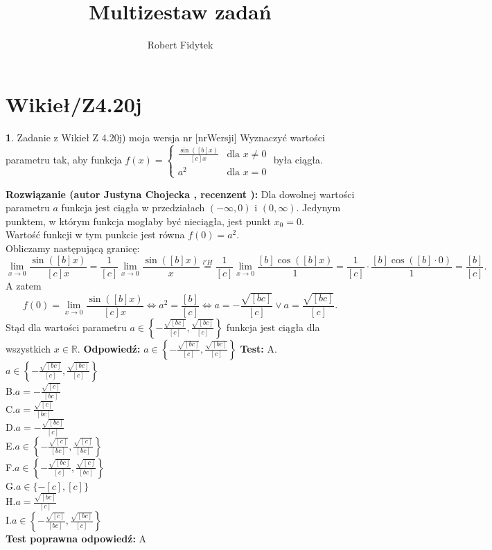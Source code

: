 \documentclass[12pt, a4paper]{article}
\title{Multizestaw zadań}
\author{Robert Fidytek}
\date{}
\theoremstyle{definition} %
\newtheorem{zad}{}
\newcommand{\kategoria}[1]{\section{#1}} %
\newcommand{\zadStart}[1]{\begin{zad}#1\newline} %
\newcommand{\zadStop}{\end{zad}}   %
\newcommand{\rozwStart}[2]{\noindent \textbf{Rozwiązanie (autor #1 , recenzent #2): }\newline} %
\newcommand{\rozwStop}{\newline}                                            %
\newcommand{\odpStart}{\noindent \textbf{Odpowiedź:}\newline}    %
\newcommand{\odpStop}{\newline}                                             %
\newcommand{\testStart}{\noindent \textbf{Test:}\newline} %
\newcommand{\testStop}{\newline} %
\newcommand{\kluczStart}{\noindent \textbf{Test poprawna odpowiedź:}\newline} %
\newcommand{\kluczStop}{\newline} %
\begin{document}
\maketitle


\kategoria{Wikieł/Z4.20j}
\zadStart{Zadanie z Wikieł Z 4.20j) moja wersja nr [nrWersji]}
Wyznaczyć wartości parametru tak, aby funkcja $
f(x) = \left\{ \begin{array}{ll}
\frac{\sin([b]x)}{[c]x} & \textrm{dla $x\neq 0$}\\
a^{2} & \textrm{dla $x=0$}
\end{array} \right.
$ była ciągła.
\zadStop
\rozwStart{Justyna Chojecka}{}
Dla dowolnej wartości parametru $a$ funkcja jest ciągła w przedziałach $(-\infty,0)$ i $(0,\infty)$. Jedynym punktem, w którym funkcja mogłaby być nieciągła, jest punkt $x_{0}=0$.\\
Wartość funkcji w tym punkcie jest równa $f(0)=a^{2}$.\\
Obliczamy następującą granicę:
$$\lim\limits_{x\to 0}\frac{\sin([b]x)}{[c]x}=\frac{1}{[c]}\lim\limits_{x\to 0}\frac{\sin([b]x)}{x}\overset{l'H}{=}\frac{1}{[c]}\lim\limits_{x\to 0}\frac{[b]\cos([b]x)}{1}=\frac{1}{[c]}\cdot\frac{[b]\cos([b]\cdot 0)}{1}=\frac{[b]}{[c]}.$$
A zatem
$$f(0)=\lim\limits_{x\to 0}\frac{\sin([b]x)}{[c]x}\iff a^{2}=\frac{[b]}{[c]} \iff a=-\frac{\sqrt{[bc]}}{[c]}\lor a=\frac{\sqrt{[bc]}}{[c]}.$$
Stąd dla wartości parametru $a\in\left\{-\frac{\sqrt{[bc]}}{[c]},\frac{\sqrt{[bc]}}{[c]}\right\}$ funkcja jest ciągła dla wszystkich $x\in\mathbb{R}.$
\rozwStop
\odpStart
$a\in\left\{-\frac{\sqrt{[bc]}}{[c]},\frac{\sqrt{[bc]}}{[c]}\right\}$
\odpStop
\testStart
A.$a\in\left\{-\frac{\sqrt{[bc]}}{[c]},\frac{\sqrt{[bc]}}{[c]}\right\}$\\
B.$a=-\frac{\sqrt{[c]}}{[bc]}$\\
C.$a=\frac{\sqrt{[c]}}{[bc]}$\\
D.$a=-\frac{\sqrt{[bc]}}{[c]}$\\
E.$a\in\left\{-\frac{\sqrt{[c]}}{[bc]},\frac{\sqrt{[c]}}{[bc]}\right\}$\\
F.$a\in\left\{-\frac{\sqrt{[bc]}}{[c]},\frac{\sqrt{[c]}}{[bc]}\right\}$\\
G.$a\in\{-[c],[c]\}$\\
H.$a=\frac{\sqrt{[bc]}}{[c]}$\\
I.$a\in\left\{-\frac{\sqrt{[c]}}{[bc]},\frac{\sqrt{[bc]}}{[c]}\right\}$\\
\testStop
\kluczStart
A
\kluczStop
\end{document}
